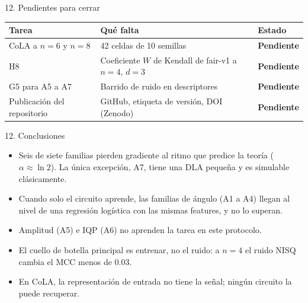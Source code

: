 \documentclass[aspectratio=169,10pt]{beamer}
\newcommand{\pend}{\textcolor{ambar!80!black}{\textbf{Pendiente}}}
\begin{document}
\begin{frame}{12. Pendientes para cerrar}
\small
\begin{tabularx}{\textwidth}{@{}Xll@{}}
\toprule
\textbf{Tarea} & \textbf{Qué falta} & \textbf{Estado}\\
\midrule
CoLA a $n=6$ y $n=8$ & 42 celdas de 10 semillas & \pend\\
H8 & Coeficiente $W$ de Kendall de fair-v1 a $n=4$, $d=3$ & \pend\\
G5 para A5 a A7 & Barrido de ruido en descriptores & \pend\\
Publicación del repositorio & GitHub, etiqueta de versión, DOI (Zenodo) & \pend\\
\bottomrule
\end{tabularx}
\end{frame}

\begin{frame}{12. Conclusiones}
\begin{itemize}\setlength{\itemsep}{0.5em}
\item Seis de siete familias pierden gradiente al ritmo que predice la teoría ($\alpha\approx\ln 2$). La única excepción, A7, tiene una DLA pequeña y es simulable clásicamente.
\item Cuando solo el circuito aprende, las familias de ángulo (A1 a A4) llegan al nivel de una regresión logística con las mismas features, y no lo superan.
\item Amplitud (A5) e IQP (A6) no aprenden la tarea en este protocolo.
\item El cuello de botella principal es entrenar, no el ruido: a $n=4$ el ruido NISQ cambia el MCC menos de 0.03.
\item En CoLA, la representación de entrada no tiene la señal; ningún circuito la puede recuperar.
\end{itemize}
\end{frame}
\end{document}
